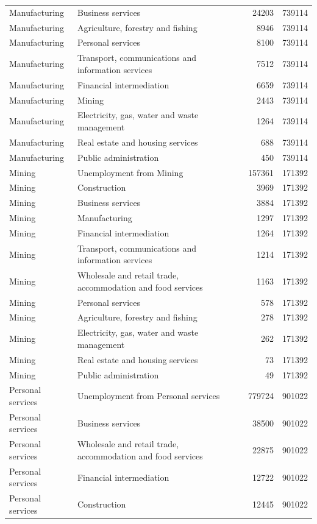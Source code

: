 \begin{longtable}{llrr}
Manufacturing & Business services & 24203 & 739114 \\
Manufacturing & Agriculture, forestry and fishing & 8946 & 739114 \\
Manufacturing & Personal services & 8100 & 739114 \\
Manufacturing & Transport, communications and information services & 7512 & 739114 \\
Manufacturing & Financial intermediation & 6659 & 739114 \\
Manufacturing & Mining & 2443 & 739114 \\
Manufacturing & Electricity, gas, water and waste management & 1264 & 739114 \\
Manufacturing & Real estate and housing services & 688 & 739114 \\
Manufacturing & Public administration & 450 & 739114 \\
Mining & Unemployment from Mining & 157361 & 171392 \\
Mining & Construction & 3969 & 171392 \\
Mining & Business services & 3884 & 171392 \\
Mining & Manufacturing & 1297 & 171392 \\
Mining & Financial intermediation & 1264 & 171392 \\
Mining & Transport, communications and information services & 1214 & 171392 \\
Mining & Wholesale and retail trade, accommodation and food services & 1163 & 171392 \\
Mining & Personal services & 578 & 171392 \\
Mining & Agriculture, forestry and fishing & 278 & 171392 \\
Mining & Electricity, gas, water and waste management & 262 & 171392 \\
Mining & Real estate and housing services & 73 & 171392 \\
Mining & Public administration & 49 & 171392 \\
Personal services & Unemployment from Personal services & 779724 & 901022 \\
Personal services & Business services & 38500 & 901022 \\
Personal services & Wholesale and retail trade, accommodation and food services & 22875 & 901022 \\
Personal services & Financial intermediation & 12722 & 901022 \\
Personal services & Construction & 12445 & 901022 \\

\end{longtable}
